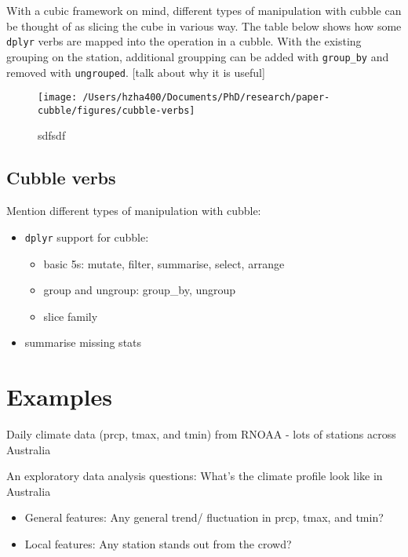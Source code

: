 \documentclass{article}
\begin{document}
With a cubic framework on mind, different types of manipulation with
cubble can be thought of as slicing the cube in various way. The table
below shows how some \texttt{dplyr} verbs are mapped into the operation
in a cubble. With the existing grouping on the station, additional
groupping can be added with \texttt{group\_by} and removed with
\texttt{ungrouped}. {[}talk about why it is useful{]}

\begin{figure}
\texttt{[image: /Users/hzha400/Documents/PhD/research/paper-cubble/figures/cubble-verbs]} \caption{sdfsdf}\label{fig:verbs}
\end{figure}

\hypertarget{cubble-verbs}{%
\subsection{Cubble verbs}\label{cubble-verbs}}

Mention different types of manipulation with cubble:

\begin{itemize}
\tightlist
\item
  \texttt{dplyr} support for cubble:

  \begin{itemize}
  \tightlist
  \item
    basic 5s: mutate, filter, summarise, select, arrange
  \item
    group and ungroup: group\_by, ungroup
  \item
    slice family
  \end{itemize}
\item
  summarise missing stats
\end{itemize}

\newpage

\hypertarget{examples}{%
\section{Examples}\label{examples}}

Daily climate data (prcp, tmax, and tmin) from RNOAA - lots of stations
across Australia

An exploratory data analysis questions: What's the climate profile look
like in Australia

\begin{itemize}
\tightlist
\item
  General features: Any general trend/ fluctuation in prcp, tmax, and
  tmin?
\item
  Local features: Any station stands out from the crowd?
\end{itemize}
\end{document}
